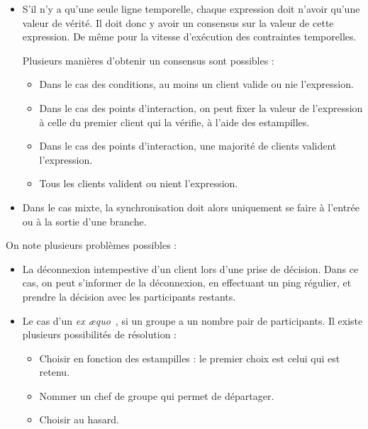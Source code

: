 \documentclass{article}
\begin{document}
\begin{itemize}
	\item S'il n'y a qu'une seule ligne temporelle, chaque expression doit n'avoir qu'une valeur de vérité. 
    Il doit donc y avoir un consensus sur la valeur de cette expression. 
    De même pour la vitesse d'exécution des contraintes temporelles.
    
    Plusieurs manières d'obtenir un consensus sont possibles : 
    \begin{itemize}
        \item Dans le cas des conditions, au moins un client valide ou nie l'expression. 
        \item Dans le cas des points d'interaction, on peut fixer la valeur de l'expression à celle du premier client qui la vérifie, à l'aide des estampilles. %
        \item Dans le cas des points d'interaction, une majorité de clients valident l'expression.
        \item Tous les clients valident ou nient l'expression.
    \end{itemize}

	\item Dans le cas mixte, la synchronisation doit alors uniquement se faire à l'entrée ou à la sortie d'une branche.
\end{itemize}

On note plusieurs problèmes possibles : 
\begin{itemize}
    \item La déconnexion intempestive d'un client lors d'une prise de décision. 
    Dans ce cas, on peut s'informer de la déconnexion, en effectuant un ping régulier, et prendre la décision avec les participants restants. 
    \item Le cas d'un \textit{ex æquo}~, si un groupe a un nombre pair de participants.
    Il existe plusieurs possibilités de résolution : 
    \begin{itemize}
        \item Choisir en fonction des estampilles : le premier choix est celui qui est retenu.
        \item Nommer un chef de groupe qui permet de départager.
        \item Choisir au hasard.
    \end{itemize}
\end{itemize}
\end{document}
